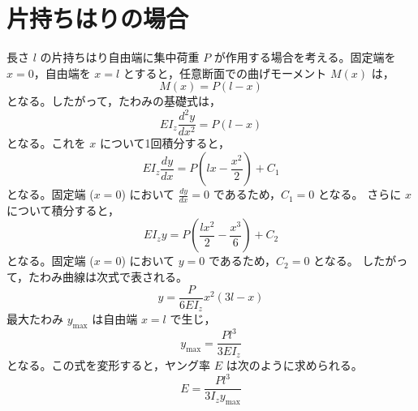 \documentclass[10pt,a4paper,titlepage]{jreport}
\begin{document}
\section{片持ちはりの場合}
長さ $l$ の片持ちはり自由端に集中荷重 $P$ が作用する場合を考える。固定端を $x=0$，自由端を $x=l$ とすると，任意断面での曲げモーメント $M(x)$ は，
\begin{equation}
    M(x) = P(l-x)
\end{equation}
となる。したがって，たわみの基礎式は，
\begin{equation}
    EI_z \frac{d^2y}{dx^2} = P(l-x)
\end{equation}
となる。これを $x$ について1回積分すると，
\begin{equation}
    EI_z \frac{dy}{dx} = P \left( lx - \frac{x^2}{2} \right) + C_1
\end{equation}
となる。固定端 ($x=0$) において $\frac{dy}{dx}=0$ であるため，$C_1 = 0$ となる。
さらに $x$ について積分すると，
\begin{equation}
    EI_z y = P \left( \frac{lx^2}{2} - \frac{x^3}{6} \right) + C_2
\end{equation}
となる。固定端 ($x=0$) において $y=0$ であるため，$C_2 = 0$ となる。
したがって，たわみ曲線は次式で表される。
\begin{equation}
    y = \frac{P}{6EI_z}x^2(3l-x)
\end{equation}
最大たわみ $y_{\max}$ は自由端 $x=l$ で生じ，
\begin{equation}
    y_{\max} = \frac{Pl^3}{3EI_z}
\end{equation}
となる。この式を変形すると，ヤング率 $E$ は次のように求められる。
\begin{equation}
    E = \frac{Pl^3}{3I_z y_{\max}}
\end{equation}
\end{document}
